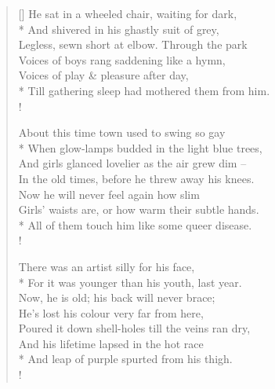 \documentclass[MAIN]{subfiles}
\begin{document}
\settowidth{\versewidth}{Till gathering sleep had mothered them from him.}
\begin{verse}[\versewidth]
He sat in a wheeled chair, waiting for dark,\\*
And shivered in his ghastly suit of grey,\\
Legless, sewn short at elbow. Through the park\\
Voices of boys rang saddening like a hymn,\\
Voices of play \& pleasure after day,\\*
Till gathering sleep had mothered them from him.\\!

About this time town used to swing so gay\\*
When glow-lamps budded in the light blue trees,\\
And girls glanced lovelier as the air grew dim --\\
In the old times, before he threw away his knees.\\
Now he will never feel again how slim\\
Girls' waists are, or how warm their subtle hands.\\*
All of them touch him like some queer disease.\\!

There was an artist silly for his face,\\*
For it was younger than his youth, last year.\\
Now, he is old; his back will never brace;\\
He's lost his colour very far from here,\\
Poured it down shell-holes till the veins ran dry,\\
And  his lifetime lapsed in the hot race\\*
And leap of purple spurted from his thigh.\\!


\end{verse}
\end{document}

